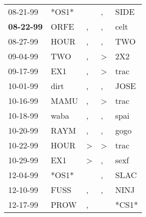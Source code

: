 \begin{supertabular}{p{0.07\textwidth}p{0.06\textwidth}p{0.02\textwidth}p{0.02\textwidth}p{0.06\textwidth}}
          08-21-99\textsuperscript{} &                            *OS1* &                  &                , &           SIDE\textsuperscript{} \\
 \textbf{08-22-99\textsuperscript{}} &           ORFE\textsuperscript{} &                , &                , &           celt\textsuperscript{} \\
          08-27-99\textsuperscript{} &           HOUR\textsuperscript{} &                , &                , &            TWO\textsuperscript{} \\
          09-04-99\textsuperscript{} &            TWO\textsuperscript{} &                , &     \textgreater &            2X2\textsuperscript{} \\
          09-17-99\textsuperscript{} &            EX1\textsuperscript{} &                , &     \textgreater &           trac\textsuperscript{} \\
          10-01-99\textsuperscript{} &           dirt\textsuperscript{} &                , &                , &           JOSE\textsuperscript{} \\
          10-16-99\textsuperscript{} &           MAMU\textsuperscript{} &                , &     \textgreater &           trac\textsuperscript{} \\
          10-18-99\textsuperscript{} &           waba\textsuperscript{} &                , &                , &           spai\textsuperscript{} \\
          10-20-99\textsuperscript{} &           RAYM\textsuperscript{} &                , &                , &           gogo\textsuperscript{} \\
          10-22-99\textsuperscript{} &           HOUR\textsuperscript{} &     \textgreater &     \textgreater &           trac\textsuperscript{} \\
          10-29-99\textsuperscript{} &            EX1\textsuperscript{} &     \textgreater &                , &           sexf\textsuperscript{} \\
          12-04-99\textsuperscript{} &                            *OS1* &                  &                , &           SLAC\textsuperscript{} \\
          12-10-99\textsuperscript{} &           FUSS\textsuperscript{} &                , &                , &           NINJ\textsuperscript{} \\
          12-17-99\textsuperscript{} &           PROW\textsuperscript{} &                , &                  &                            *CS1* \\

\end{supertabular}
